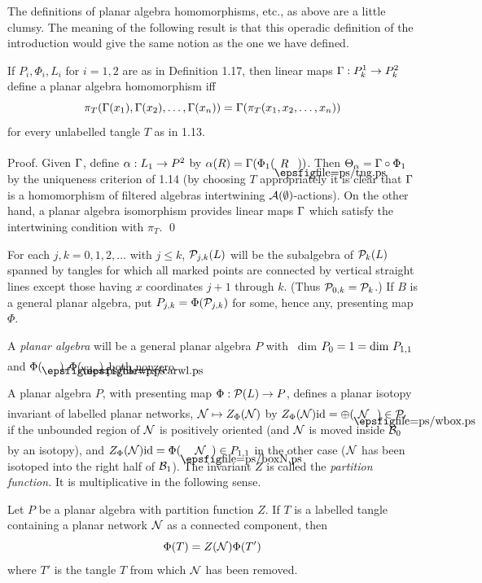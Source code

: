 \bs The definitions of planar algebra homomorphisms, etc., as above
are a little clumsy.
The meaning of the following result is that this operadic
definition of the introduction would give the same notion as the one we have defined.


\bigskip
{} If $P_i,\Phi_i,L_i$ for $i=1,2$ are as
in Definition {\rm{1.17}}, then linear maps $\G: P^1_k\to P^2_k$
define a planar algebra homomorphism iff
$$
\pi_T(\G(x_1),\G(x_2),\dots ,\G(x_n)) =\G(\pi_T(x_1,x_2,\dots ,x_n))
$$
for every unlabelled tangle $T$ as in {\rm{1.13}}.

\bigskip
{\sc Proof.} Given  $\G$, define $\a: L_1\to P^2$ by
$\a(R)=\G(\Phi_1(\tangle{R} ))$.
Then $\Theta_\a=\G\circ\Phi_1$ by the uniqueness criterion of 1.14
(by choosing $T$ appropriately it is clear that $\G$ is a
homomorphism of filtered algebras intertwining $\cal
A(\emptyset)$-actions). On the other hand, a planar algebra isomorphism
provides linear maps $\G$ which satisfy the intertwining condition
with $\pi_T$. \qed


 For each $j,k=0,1,2,\dots$ with $j\leq
k$, $\P_{j,k}(L)$ will be the subalgebra of $\P_k(L)$ spanned by
tangles for which all marked points are connected by vertical
straight lines  except those having $x$ coordinates $j+1$ through
$k$. (Thus $\P_{0,k}=\P_k$.) If $B$ is a general planar algebra, put
$P_{j,k}=\Phi(\P_{j,k})$ for some, hence any, presenting map $\Phi$.

 A {\it planar algebra} will be a
general planar algebra $P$ with
 \ dim $P_0=1={\op{dim}} \ P_{1,1}$ and
$\Phi(\caright\ ),\Phi(\caleft\ )$ both nonzero.

\bs A  planar algebra $P$, with presenting map
$\Phi: \P(L)\to P$, defines a planar isotopy invariant of
labelled planar networks, ${\cal N}\mapsto Z_{\Phi}(\cal N)$ by
$Z_{\Phi}(\cal N){\op{id}}=\Phi (\blankbox{\cal N})\in P_0$ if
the unbounded region of ${\cal N}$ is positively oriented 
(and ${\cal N}$ is moved inside $\b_0$ by an isotopy), and 
$Z_{\Phi}({\cal N}){\op{id}}=\Phi(\tanglearrow{\cal N}\  )\in P_{1,1}$
in the other case ($\cal N$ has been isotoped into the right
half of $\b_1$). The invariant $Z$ is called the {\it partition
function.} It is multiplicative in the following sense.

\bs{} Let $P$  be a planar algebra with
partition function $Z$. If $T$ is a labelled tangle containing
a planar network $\cal N$ as a connected component, then
$$
\Phi(T)=Z({\cal N})\Phi(T')
$$
where $T'$ is the tangle $T$ from which $\cal N$ has been
removed.

